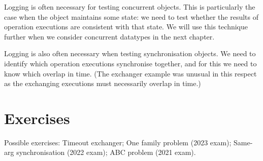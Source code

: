 Logging is often necessary for testing concurrent objects.  This is
particularly the case when the object maintains some state: we need to test
whether the results of operation executions are consistent with that state.
We will use this technique further when we consider concurrent datatypes in
the next chapter.

Logging is also often necessary when testing synchronisation objects.  We need
to identify which operation executions synchronise together, and for this we
need to know which overlap in time.  (The exchanger example was unusual in
this respect as the exchanging executions must necessarily overlap in time.)
 



\section*{Exercises}






Possible  exercises:
Timeout exchanger;
One family problem (2023 exam);
Same-arg synchronisation (2022 exam);
ABC problem (2021 exam).


